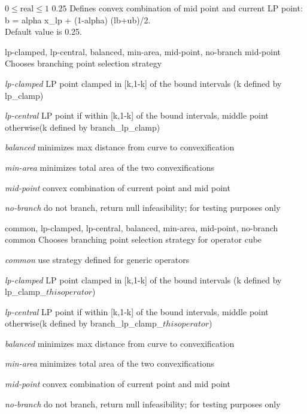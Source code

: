 %
{$0\leq\textrm{real}\leq1$}%
{$0.25$}%
{Defines convex combination of mid point and current LP point: b = alpha x\_lp + (1-alpha) (lb+ub)/2.\\
Default value is 0.25.}%
{}

%
{lp-clamped, lp-central, balanced, min-area, mid-point, no-branch}%
{mid-point}%
{Chooses branching point selection strategy}%
{\begin{list}{}{
\setlength{\parsep}{0em}
\setlength{\leftmargin}{3ex}
\setlength{\labelwidth}{1ex}
\setlength{\itemindent}{0ex}
\setlength{\topsep}{0pt}}
\item[\textit{lp-clamped}] LP point clamped in [k,1-k] of the bound intervals (k defined by lp\_clamp)
\item[\textit{lp-central}] LP point if within [k,1-k] of the bound intervals, middle point otherwise(k defined by branch\_lp\_clamp)
\item[\textit{balanced}] minimizes max distance from curve to convexification
\item[\textit{min-area}] minimizes total area of the two convexifications
\item[\textit{mid-point}] convex combination of current point and mid point
\item[\textit{no-branch}] do not branch, return null infeasibility; for testing purposes only
\end{list}
}

%
{common, lp-clamped, lp-central, balanced, min-area, mid-point, no-branch}%
{common}%
{Chooses branching point selection strategy for operator cube}%
{\begin{list}{}{
\setlength{\parsep}{0em}
\setlength{\leftmargin}{3ex}
\setlength{\labelwidth}{1ex}
\setlength{\itemindent}{0ex}
\setlength{\topsep}{0pt}}
\item[\textit{common}] use strategy defined for generic operators
\item[\textit{lp-clamped}] LP point clamped in [k,1-k] of the bound intervals (k defined by lp\_clamp\_${this operator}$)
\item[\textit{lp-central}] LP point if within [k,1-k] of the bound intervals, middle point otherwise(k defined by branch\_lp\_clamp\_${this operator}$)
\item[\textit{balanced}] minimizes max distance from curve to convexification
\item[\textit{min-area}] minimizes total area of the two convexifications
\item[\textit{mid-point}] convex combination of current point and mid point
\item[\textit{no-branch}] do not branch, return null infeasibility; for testing purposes only
\end{list}
}

